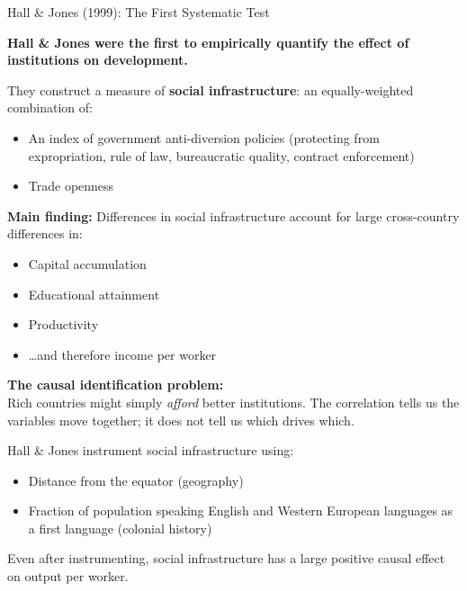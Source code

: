 \documentclass[10pt]{beamer}
\begin{document}
\begin{frame}[allowframebreaks]{Hall \& Jones (1999): The First Systematic Test}

\textbf{Hall \& Jones were the first to empirically quantify the effect of institutions on development.}


They construct a measure of \textbf{social infrastructure}: an equally-weighted combination of:
\begin{itemize}
\item An index of government anti-diversion policies (protecting from expropriation, rule of law, bureaucratic quality, contract enforcement)
\item Trade openness
\end{itemize}


\textbf{Main finding:}
Differences in social infrastructure account for large cross-country differences in:
\begin{itemize}
\item Capital accumulation
\item Educational attainment
\item Productivity
\item \ldots and therefore income per worker
\end{itemize}


\textbf{The causal identification problem:}\\
Rich countries might simply \emph{afford} better institutions. The correlation tells us the variables move together; it does not tell us which drives which.


Hall \& Jones instrument social infrastructure using:
\begin{itemize}
\item Distance from the equator (geography)
\item Fraction of population speaking English and Western European languages as a first language (colonial history)
\end{itemize}


\alert{Even after instrumenting, social infrastructure has a large positive causal effect on output per worker.}
\end{frame}
\end{document}
